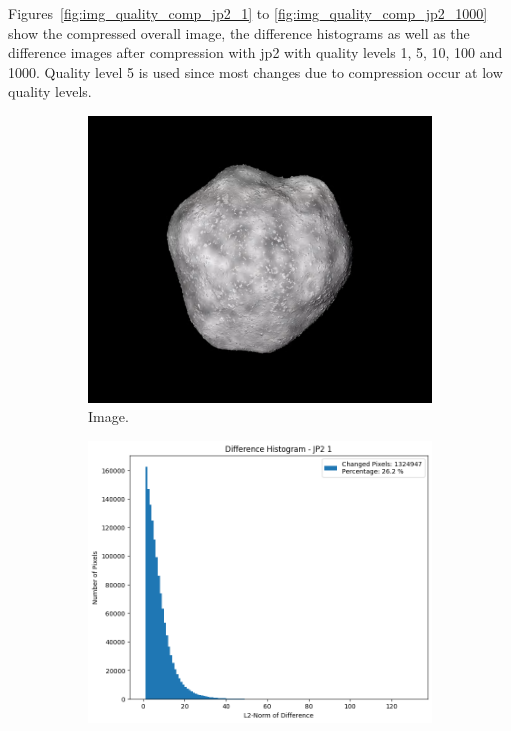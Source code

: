 Figures~\ref{fig:img_quality_comp_jp2_1} to \ref{fig:img_quality_comp_jp2_1000} show the compressed overall image, the difference histograms as well as the difference images after compression with \gls{jp2} with quality levels \SI{1}{}, \SI{5}{}, \SI{10}{}, \SI{100}{} and \SI{1000}{}. Quality level \SI{5}{} is used since most changes due to compression occur at low quality levels.

\begin{figure}[htb]
    \centering
    \begin{subfigure}[b]{0.48\textwidth}
        \centering
        \includegraphics[width=\textwidth]{doc/thesis/0_figures/compare_quality/set1/jp2_1.png}
        \caption{Image.}
        \label{fig:img_quality_comp_jp2_1_orig}
    \end{subfigure}
    \begin{subfigure}[b]{0.48\textwidth}
        \centering
        \includegraphics[width=\textwidth]{doc/thesis/0_figures/compare_quality/set1/jp2_1_diff_histogram.png}

\end{subfigure}
\end{figure}

